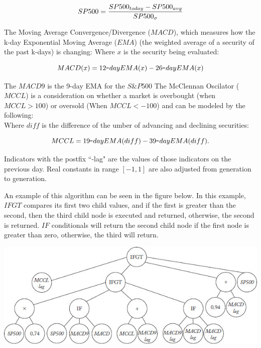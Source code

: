 \documentclass{article}
\renewcommand{\_}{\ifincsname_\else\legacyunderscore\fi}
\begin{document}
\begin{equation}
    \Large SP500 = \frac{SP500_{today} - SP500_{avg}}{SP500_\sigma}
\end{equation}

The Moving Average Convergence/Divergence (\textbf{$MACD$}), which measures how the k-day Exponential Moving Average ($EMA$) (the weighted average of a security of the past k-days) is changing:
Where $x$ is the security being evaluated:

\begin{equation}
    \Large MACD(x) = 12\text{-}day EMA(x) - 26\text{-}day EMA(x)
\end{equation}

The \textbf{$MACD9$} is the 9-day EMA for the $S\&P500$
The McClennan Oscilator ($MCCL$) is a consideration on whether a market is overbought (when $MCCL > 100$) or oversold (When $MCCL < -100$) and can be modeled by the following:\\
Where $diff$ is the difference of the  umber of advancing and declining securities:

\begin{equation}
    \Large MCCL = 19\text{-}day EMA(diff) - 39\text{-}day EMA(diff).
\end{equation}

Indicators with the postfix ``-lag" are the values of those indicators on the previous day. Real constants in range $[-1, 1]$ are also adjusted from generation to generation.

An example of this algorithm can be seen in the figure below. In this example, $IFGT$ compares its first two child values, and if the first is greater than the second, then the third child node is executed and returned, otherwise, the second is returned. $IF$ conditionals will return the second child node if the first node is greater than zero, otherwise, the third will return.
\begin{center}
    \includegraphics[width=\textwidth]{gen_alg_tree.jpg}
\end{center}
\end{document}
